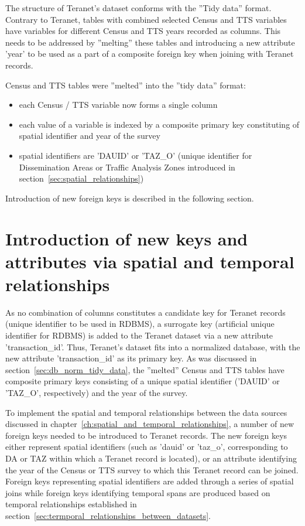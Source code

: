 \vspace{5mm}

The structure of Teranet's dataset conforms with the ''Tidy data'' format.
Contrary to Teranet, tables with combined selected Census and TTS variables have variables for different Census and TTS years recorded as columns.
This needs to be addressed by ''melting'' these tables and introducing a new attribute 'year' to be used as a part of a composite foreign key when joining with Teranet records.

\vspace{5mm}

Census and TTS tables were ''melted'' into the ''tidy data'' format:
\begin{itemize}
    \item each Census / TTS variable now forms a single column
    \item each value of a variable is indexed by a composite primary key constituting of spatial identifier and year of the survey
    \item spatial identifiers are 'DAUID' or 'TAZ\_O' (unique identifier for Dissemination Areas or Traffic Analysis Zones introduced in section~\ref{sec:spatial_relationships})
\end{itemize}

Introduction of new foreign keys is described in the following section.

\section{Introduction of new keys and attributes via spatial and temporal relationships} \label{sec:introduction_of_new_keys}

As no combination of columns constitutes a candidate key for Teranet records (unique identifier to be used in RDBMS), a surrogate key (artificial unique identifier for RDBMS) is added to the Teranet dataset via a new attribute 'transaction\_id'.
Thus, Teranet's dataset fits into a normalized database, with the new attribute 'transaction\_id' as its primary key.
As was discussed in section~\ref{sec:db_norm_tidy_data}, the ''melted'' Census and TTS tables have composite primary keys consisting of a unique spatial identifier ('DAUID' or 'TAZ\_O', respectively) and the year of the survey.

To implement the spatial and temporal relationships between the data sources discussed in chapter~\ref{ch:spatial_and_temporal_relationships}, a number of new foreign keys needed to be introduced to Teranet records.
The new foreign keys either represent spatial identifiers (such as 'dauid' or 'taz\_o', corresponding to DA or TAZ within which a Teranet record is located), or an attribute identifying the year of the Census or TTS survey to which this Teranet record can be joined.
Foreign keys representing spatial identifiers are added through a series of spatial joins while foreign keys identifying temporal spans are produced based on temporal relationships established in section~\ref{sec:termporal_relationships_between_datasets}.

